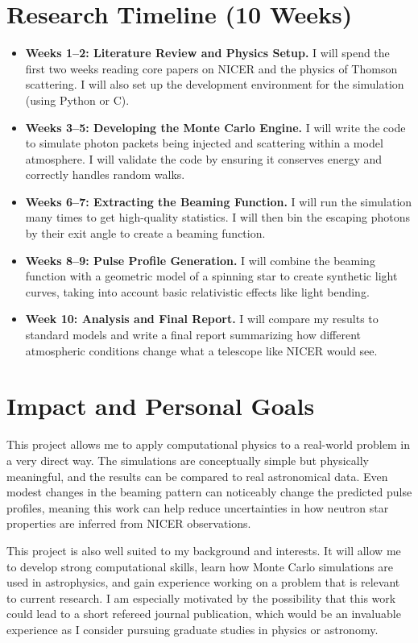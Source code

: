 \documentclass[11pt]{article}
\begin{document}
\section*{Research Timeline (10 Weeks)}
\begin{itemize}[leftmargin=*]
    \item \textbf{Weeks 1--2: Literature Review and Physics Setup.} I will spend the first two weeks reading core papers on NICER and the physics of Thomson scattering. I will also set up the development environment for the simulation (using Python or C).
    \item \textbf{Weeks 3--5: Developing the Monte Carlo Engine.} I will write the code to simulate photon packets being injected and scattering within a model atmosphere. I will validate the code by ensuring it conserves energy and correctly handles random walks.
    \item \textbf{Weeks 6--7: Extracting the Beaming Function.} I will run the simulation many times to get high-quality statistics. I will then bin the escaping photons by their exit angle to create a beaming function.
    \item \textbf{Weeks 8--9: Pulse Profile Generation.} I will combine the beaming function with a geometric model of a spinning star to create synthetic light curves, taking into account basic relativistic effects like light bending.
    \item \textbf{Week 10: Analysis and Final Report.} I will compare my results to standard models and write a final report summarizing how different atmospheric conditions change what a telescope like NICER would see.
\end{itemize}

\section*{Impact and Personal Goals}
This project allows me to apply computational physics to a real-world problem in a very direct way. The simulations are conceptually simple but physically meaningful, and the results can be compared to real astronomical data. Even modest changes in the beaming pattern can noticeably change the predicted pulse profiles, meaning this work can help reduce uncertainties in how neutron star properties are inferred from NICER observations.

This project is also well suited to my background and interests. It will allow me to develop strong computational skills, learn how Monte Carlo simulations are used in astrophysics, and gain experience working on a problem that is relevant to current research. I am especially motivated by the possibility that this work could lead to a short refereed journal publication, which would be an invaluable experience as I consider pursuing graduate studies in physics or astronomy.
\end{document}
